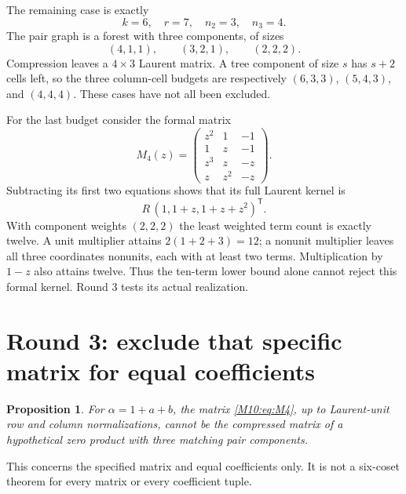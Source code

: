 \documentclass[11pt,a4paper,oneside]{report}
\newtheorem{proposition}[theorem]{Proposition}
\theoremstyle{definition}
\theoremstyle{remark}
\begin{document}
The remaining case is exactly
\begin{equation}\label{M10:eq:six-core}
k=6,\quad r=7,\quad n_2=3,\quad n_3=4.
\end{equation}
The pair graph is a forest with three components, of sizes
\[
(4,1,1),\qquad (3,2,1),\qquad (2,2,2).
\]
Compression leaves a $4\times3$ Laurent matrix. A tree component
of size $s$ has $s+2$ cells left, so the three column-cell budgets
are respectively $(6,3,3)$, $(5,4,3)$, and $(4,4,4)$.
These cases have not all been excluded.

For the last budget consider the formal matrix
\begin{equation}\label{M10:eq:M4}
M_4(z)=\begin{pmatrix}
z^2&1&-1\\1&z&-1\\z^3&z&-z\\z&z^2&-z
\end{pmatrix}.
\end{equation}
Subtracting its first two equations shows that its full Laurent
kernel is
\[
R\,(1,1+z,1+z+z^2)^{\mathsf T}.
\]
With component weights $(2,2,2)$ the least weighted term count
is exactly twelve. A unit multiplier attains $2(1+2+3)=12$;
a nonunit multiplier leaves all three coordinates nonunits,
each with at least two terms. Multiplication by $1-z$ also
attains twelve. Thus the ten-term lower bound alone cannot
reject this formal kernel. Round 3 tests its actual realization.

\section{Round 3: exclude that specific matrix for equal coefficients}
\begin{proposition}\label{M10:prop:M4}
For $\alpha=1+a+b$, the matrix \eqref{M10:eq:M4}, up to Laurent-unit
row and column normalizations, cannot be the compressed matrix of
a hypothetical zero product with three matching pair components.
\end{proposition}
This concerns the specified matrix and equal coefficients only.
It is not a six-coset theorem for every matrix or every coefficient
tuple.
\end{document}

